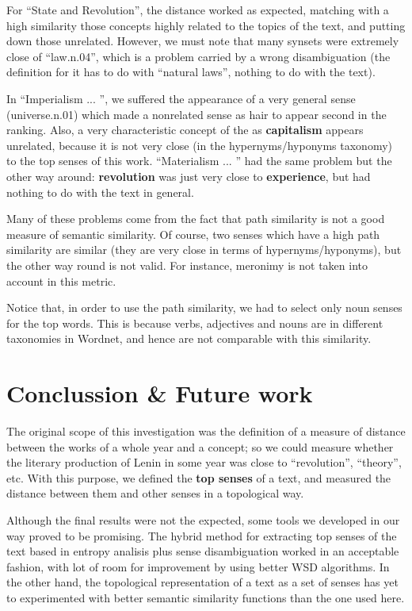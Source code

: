 \documentclass{pnastwo}
\begin{document}
\begin{article}
For ``State and Revolution'', the distance worked as expected, matching with a high similarity those concepts highly related to the topics of the text, and putting down those unrelated. However, we must note that many synsets were extremely close of ``law.n.04'', which is a problem carried by a wrong disambiguation (the definition for it has to do with ``natural laws'', nothing to do with the text).

In ``Imperialism ... '', we suffered the appearance of a very general sense (universe.n.01) which made a nonrelated sense as hair to appear second in the ranking. Also, a very characteristic concept of the  as \textbf{capitalism} appears unrelated, because it is not very close (in the hypernyms/hyponyms taxonomy) to the top senses of this work. ``Materialism ... '' had the same problem but the other way around: \textbf{revolution} was just very close to \textbf{experience}, but had nothing to do with the text in general.

Many of these problems come from the fact that path similarity is not a good measure of semantic similarity. Of course, two senses which have a high path similarity are similar (they are very close in terms of hypernyms/hyponyms), but the other way round is not valid. For instance, meronimy is not taken into account in this metric.
 
Notice that, in order to use the path similarity, we had to select only noun senses for the top words. This is because verbs, adjectives and nouns are in different taxonomies in Wordnet, and hence are not comparable with this similarity. 





\section{Conclussion \& Future work}

The original scope of this investigation was the definition of a measure of distance between the works of a whole year and a concept; so we could measure whether the literary production of Lenin in some year was close to ``revolution'', ``theory'', etc.  With this purpose, we defined the \textbf{top senses} of a text, and measured the distance between them and other senses in a topological way.

Although the final results were not the expected, some tools we developed in our way proved to be promising. The hybrid method for extracting top senses of the text based in entropy analisis plus sense disambiguation worked in an acceptable fashion, with lot of room for improvement by using better WSD algorithms. In the other hand, the topological representation of a text as a set of senses has yet to experimented with better semantic similarity functions than the one used here. 




\end{article}
\end{document}
